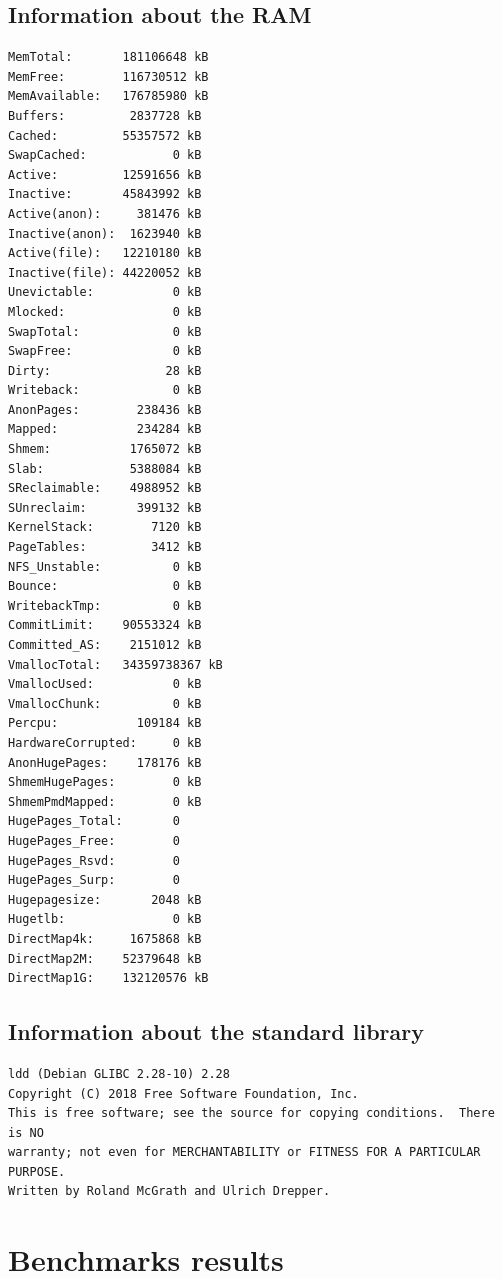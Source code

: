 	\subsection{Information about the RAM}
	\begin{lstlisting}[frame=single]
MemTotal:       181106648 kB
MemFree:        116730512 kB
MemAvailable:   176785980 kB
Buffers:         2837728 kB
Cached:         55357572 kB
SwapCached:            0 kB
Active:         12591656 kB
Inactive:       45843992 kB
Active(anon):     381476 kB
Inactive(anon):  1623940 kB
Active(file):   12210180 kB
Inactive(file): 44220052 kB
Unevictable:           0 kB
Mlocked:               0 kB
SwapTotal:             0 kB
SwapFree:              0 kB
Dirty:                28 kB
Writeback:             0 kB
AnonPages:        238436 kB
Mapped:           234284 kB
Shmem:           1765072 kB
Slab:            5388084 kB
SReclaimable:    4988952 kB
SUnreclaim:       399132 kB
KernelStack:        7120 kB
PageTables:         3412 kB
NFS_Unstable:          0 kB
Bounce:                0 kB
WritebackTmp:          0 kB
CommitLimit:    90553324 kB
Committed_AS:    2151012 kB
VmallocTotal:   34359738367 kB
VmallocUsed:           0 kB
VmallocChunk:          0 kB
Percpu:           109184 kB
HardwareCorrupted:     0 kB
AnonHugePages:    178176 kB
ShmemHugePages:        0 kB
ShmemPmdMapped:        0 kB
HugePages_Total:       0
HugePages_Free:        0
HugePages_Rsvd:        0
HugePages_Surp:        0
Hugepagesize:       2048 kB
Hugetlb:               0 kB
DirectMap4k:     1675868 kB
DirectMap2M:    52379648 kB
DirectMap1G:    132120576 kB
	\end{lstlisting}

\subsection{Information about the standard library}
\begin{lstlisting}[frame=single] 
ldd (Debian GLIBC 2.28-10) 2.28
Copyright (C) 2018 Free Software Foundation, Inc.
This is free software; see the source for copying conditions.  There is NO
warranty; not even for MERCHANTABILITY or FITNESS FOR A PARTICULAR PURPOSE.
Written by Roland McGrath and Ulrich Drepper.
\end{lstlisting}
	
\section{Benchmarks results} %

